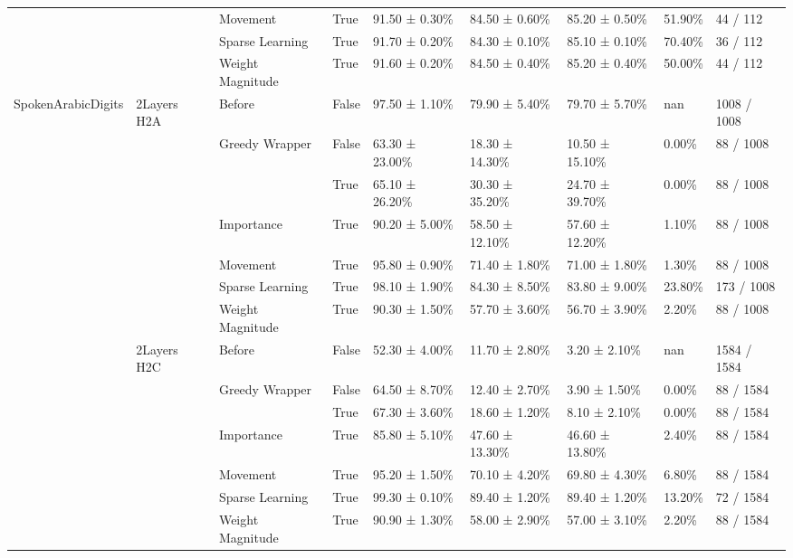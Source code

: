 \begin{tabular}{lllllllll}
\cline{3-9}
 &  & Movement & True & 91.50 ± 0.30\% & 84.50 ± 0.60\% & 85.20 ± 0.50\% & 51.90\% & 44 / 112 \\
\cline{3-9}
 &  & Sparse Learning & True & 91.70 ± 0.20\% & 84.30 ± 0.10\% & 85.10 ± 0.10\% & 70.40\% & 36 / 112 \\
\cline{3-9}
 &  & Weight Magnitude & True & 91.60 ± 0.20\% & 84.50 ± 0.40\% & 85.20 ± 0.40\% & 50.00\% & 44 / 112 \\
\cline{1-9} \cline{2-9} \cline{3-9}
\multirow[t]{35}{*}{SpokenArabicDigits} & \multirow[t]{7}{*}{2Layers H2A} & Before & False & 97.50 ± 1.10\% & 79.90 ± 5.40\% & 79.70 ± 5.70\% & nan & 1008 / 1008 \\
\cline{3-9}
 &  & \multirow[t]{2}{*}{Greedy Wrapper} & False & 63.30 ± 23.00\% & 18.30 ± 14.30\% & 10.50 ± 15.10\% & 0.00\% & 88 / 1008 \\
 &  &  & True & 65.10 ± 26.20\% & 30.30 ± 35.20\% & 24.70 ± 39.70\% & 0.00\% & 88 / 1008 \\
\cline{3-9}
 &  & Importance & True & 90.20 ± 5.00\% & 58.50 ± 12.10\% & 57.60 ± 12.20\% & 1.10\% & 88 / 1008 \\
\cline{3-9}
 &  & Movement & True & 95.80 ± 0.90\% & 71.40 ± 1.80\% & 71.00 ± 1.80\% & 1.30\% & 88 / 1008 \\
\cline{3-9}
 &  & Sparse Learning & True & 98.10 ± 1.90\% & 84.30 ± 8.50\% & 83.80 ± 9.00\% & 23.80\% & 173 / 1008 \\
\cline{3-9}
 &  & Weight Magnitude & True & 90.30 ± 1.50\% & 57.70 ± 3.60\% & 56.70 ± 3.90\% & 2.20\% & 88 / 1008 \\
\cline{2-9} \cline{3-9}
 & \multirow[t]{7}{*}{2Layers H2C} & Before & False & 52.30 ± 4.00\% & 11.70 ± 2.80\% & 3.20 ± 2.10\% & nan & 1584 / 1584 \\
\cline{3-9}
 &  & \multirow[t]{2}{*}{Greedy Wrapper} & False & 64.50 ± 8.70\% & 12.40 ± 2.70\% & 3.90 ± 1.50\% & 0.00\% & 88 / 1584 \\
 &  &  & True & 67.30 ± 3.60\% & 18.60 ± 1.20\% & 8.10 ± 2.10\% & 0.00\% & 88 / 1584 \\
\cline{3-9}
 &  & Importance & True & 85.80 ± 5.10\% & 47.60 ± 13.30\% & 46.60 ± 13.80\% & 2.40\% & 88 / 1584 \\
\cline{3-9}
 &  & Movement & True & 95.20 ± 1.50\% & 70.10 ± 4.20\% & 69.80 ± 4.30\% & 6.80\% & 88 / 1584 \\
\cline{3-9}
 &  & Sparse Learning & True & 99.30 ± 0.10\% & 89.40 ± 1.20\% & 89.40 ± 1.20\% & 13.20\% & 72 / 1584 \\
\cline{3-9}
 &  & Weight Magnitude & True & 90.90 ± 1.30\% & 58.00 ± 2.90\% & 57.00 ± 3.10\% & 2.20\% & 88 / 1584 \\

\end{tabular}
